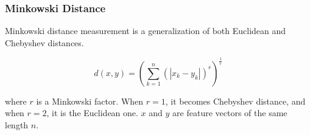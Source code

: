 \subsubsection{Minkowski Distance}

Minkowski distance measurement is a generalization of both Euclidean
and Chebyshev distances.

$$ d(x,y) = \left(\displaystyle\sum_{k=1}^{n}(|x_{k}-y_{k}|)^{r}\right)^\frac{1}{r} $$

\noindent
where $r$ is a Minkowski factor. When $r=1$, it becomes Chebyshev distance,
and when $r=2$, it is the Euclidean one. $x$ and $y$ are feature vectors of the same length $n$.
